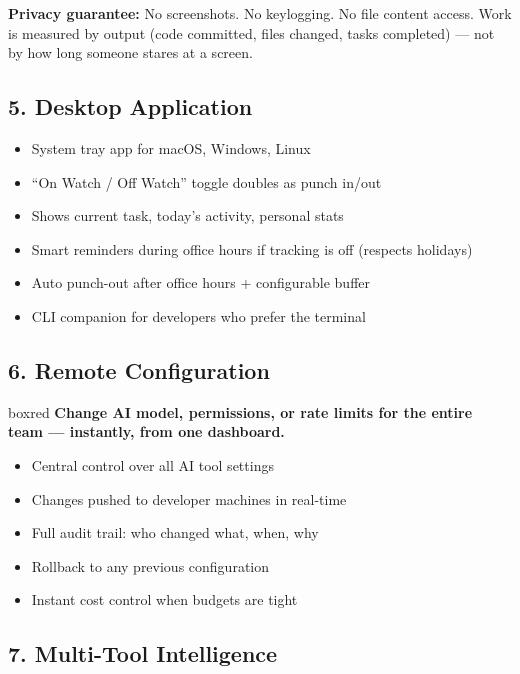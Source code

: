 \documentclass[12pt,a4paper]{article}
\begin{document}
\textbf{Privacy guarantee:} No screenshots. No keylogging. No file content access. Work is measured by output (code committed, files changed, tasks completed) --- not by how long someone stares at a screen.

\subsection{5. Desktop Application}

\begin{itemize}[nosep]
    \item System tray app for macOS, Windows, Linux
    \item ``On Watch / Off Watch'' toggle doubles as punch in/out
    \item Shows current task, today's activity, personal stats
    \item Smart reminders during office hours if tracking is off (respects holidays)
    \item Auto punch-out after office hours + configurable buffer
    \item CLI companion for developers who prefer the terminal
\end{itemize}

\subsection{6. Remote Configuration}

\begin{hookbox}{boxred}
\textbf{Change AI model, permissions, or rate limits for the entire team --- instantly, from one dashboard.}
\end{hookbox}

\begin{itemize}[nosep]
    \item Central control over all AI tool settings
    \item Changes pushed to developer machines in real-time
    \item Full audit trail: who changed what, when, why
    \item Rollback to any previous configuration
    \item Instant cost control when budgets are tight
\end{itemize}

\subsection{7. Multi-Tool Intelligence}
\end{document}
